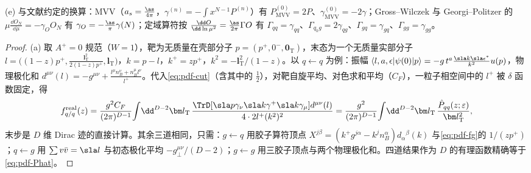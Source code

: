 \begin{proposition}
(e) 与文献约定的换算：MVV（$a_s=\frac{\as}{4\pi}$，$\gamma^{(n)}=-\int x^{N-1}P^{(n)}$）有 $P^{(0)}_{\mathrm{MVV}}=2P$、$\gamma^{(0)}_{\mathrm{MVV}}=-2\gamma$；Gross--Wilczek 与 Georgi--Politzer 的 $\mu\frac{\dd O_N}{\dd\mu}=-\gamma_OO_N$ 有 $\gamma_O=-\frac{\as}{\pi}\gamma(N)$；定域算符按 $\frac{\dd O}{\dd\ln\mu^2}=\frac{\as}{2\pi}\Gamma O$ 有 $\Gamma_{qq}=\gamma_{qq}$、$\Gamma_{q_kg}=2\gamma_{qg}$、$\Gamma_{gq}=\gamma_{gq}$、$\Gamma_{gg}=\gamma_{gg}$。
\end{proposition}

\begin{proof}
(a) 取 $A^+=0$ 规范（$W=1$），靶为无质量在壳部分子 $p=(p^+,0^-,\bm 0_{\mathrm T})$，末态为一个无质量实部分子 $l=\big((1-z)p^+,\frac{\bm l_{\mathrm T}^2}{2(1-z)p^+},\bm l_{\mathrm T}\big)$，$k=p-l$，$k^+=zp^+$，$k^2=-\bm l_{\mathrm T}^2/(1-z)$。以 $q\leftarrow q$ 为例：振幅 $\langle l,a,\epsilon|\psi(0)|p\rangle=-g\,t^a\frac{\sla k\sla\epsilon^*}{k^2}u(p)$，物理极化和 $d^{\mu\nu}(l)=-g^{\mu\nu}+\frac{l^\mu n_B^\nu+n_B^\mu l^\nu}{l^+}$。代入\cref{eq:pdf-cut}（含其中的 $\frac12$），对靶自旋平均、对色求和平均（$C_F$），一粒子相空间中的 $l^+$ 被 $\delta$ 函数固定，得
\[
f^{\mathrm{real}}_{q/q}(z)=\frac{g^2C_F}{(2\pi)^{D-1}}\!\int\!\dd^{D-2}\bm l_{\mathrm T}\,
\frac{\TrD[\sla p\gamma_\nu\sla k\gamma^+\sla k\gamma_\mu]d^{\mu\nu}(l)}{4\cdot2l^+(k^2)^2}
=\frac{g^2}{(2\pi)^{D-1}}\!\int\!\dd^{D-2}\bm l_{\mathrm T}\,\frac{\hat P_{qq}(z;\varepsilon)}{\bm l_{\mathrm T}^2},
\]
末步是 $D$ 维 Dirac 迹的直接计算。其余三道相同，只需：$g\leftarrow q$ 用胶子算符顶点 $X^{j\beta}=(k^+g^{j\alpha}-k^jn_B^\alpha)d_\alpha{}^\beta(k)$ 与\cref{eq:pdf-fg}的 $1/(zp^+)$；$q\leftarrow g$ 用 $\sum v\bar v=\sla l$ 与初态极化平均 $-g_\perp^{\mu\nu}/(D-2)$；$g\leftarrow g$ 用三胶子顶点与两个物理极化和。四道结果作为 $D$ 的有理函数精确等于\cref{eq:pdf-Phat}。

\end{proof}
